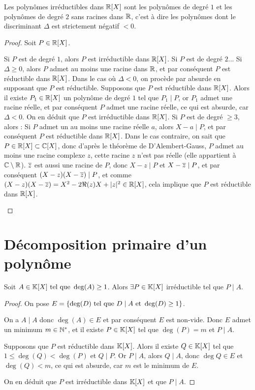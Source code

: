 \documentclass[12pt, a4paper]{report}
\begin{document}
\begin{consequence}
    Les polynômes irréductibles dans $\mathbb{R}[X]$ sont les polynômes de degré $1$ et les polynômes de degré $2$ sans racines dans $\mathbb{R}$, c'est à dire les polynômes dont le discriminant $\Delta$ est strictement négatif $< 0$.
\end{consequence}

\begin{proof}
    Soit $P \in \mathbb{R}[X]$.
    \begin{outline}
        \1 Si $P$ est de degré $1$, alors $P$ est irréductible dans $\mathbb{R}[X]$.
        \1 Si $P$ est de degré $2$...
        \2 Si $\Delta \ge 0$, alors $P$ admet au moins une racine dans $\mathbb{R}$, et par conséquent $P$ est réductible dans $\mathbb{R}[X]$.
        \2 Dans le cas où $\Delta < 0$, on procède par absurde en supposant que $P$ est réductible.
        \3 Supposons que $P$ est réductible dans $\mathbb{R}[X]$. Alors il existe $P_1 \in \mathbb{R}[X]$ un polynôme de degré $1$ tel que $P_1 \mid P$, or $P_1$ admet une racine réelle, et par conséquent $P$ admet une racine réelle, ce qui est absurde, car $\Delta < 0$.
        \3 On en déduit que $P$ est irréductible dans $\mathbb{R}[X]$.
        \1 Si $P$ est de degré $\ge 3$, alors :
        \2 Si $P$ admet un au moins une racine réelle $a$, alors $X-a \mid P$, et par conséquent $P$ est réductible dans $\mathbb{R}[X]$.
        \2 Dans le cas contraire, on sait que $P \in \mathbb{R}[X] \subset \mathbb{C}[X]$, donc d'après le théorème de D'Alembert-Gauss, $P$ admet au moins une racine complexe $z$, cette racine $z$ n'est pas réelle (elle appartient à $\mathbb{C}\setminus\mathbb{R}$). $\overline{z}$ est aussi une racine de $P$, donc $X-z \mid P$ et $X-\overline{z} \mid P$, et par conséquent $(X-z)(X-\overline{z}) \mid P$, et comme $(X-z)(X-\overline{z}) = X^2 - 2\Re(z)X + |z|^2 \in \mathbb{R}[X]$, cela implique que $P$ est réductible dans $\mathbb{R}[X]$.
    \end{outline}
\end{proof}

\section{Décomposition primaire d'un polynôme}

\begin{property}
    Soit $A \in \mathbb{K}[X] \text{ tel que } \deg(A) \ge 1$. Alors $\exists P \in \mathbb{K}[X]$ irréductible tel que $P \mid A$.
\end{property}

\begin{proof}
    On pose $E = \{\deg(D) \text{ tel que } D\mid A \text{ et } \deg(D) \ge 1\}$.

    On a $A \mid A$ donc $\deg(A) \in E$ et par conséquent $E$ est non-vide. Donc $E$ admet un minimum $m \in \mathbb{N}^*$, et il existe $P \in \mathbb{K}[X]$ tel que $\deg(P) = m$ et $P \mid A$.

    Supposons que $P$ est réductible dans $\mathbb{K}[X]$. Alors il existe $Q \in \mathbb{K}[X]$ tel que $1 \le \deg(Q) < \deg(P)$ et $Q \mid P$. Or $P \mid A$, alors $Q \mid A$, donc $\deg Q \in E$ et $\deg(Q) < m$, ce qui est absurde, car $m$ est le minimum de $E$.

    On en déduit que $P$ est irréductible dans $\mathbb{K}[X]$ et que $P \mid A$.
\end{proof}
\end{document}
